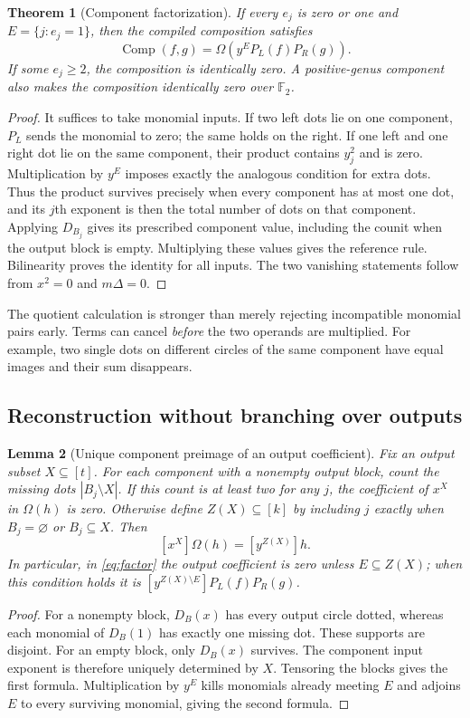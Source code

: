 \documentclass[11pt,letterpaper]{article}
\newtheorem{theorem}{Theorem}[section]
\newtheorem{lemma}[theorem]{Lemma}
\theoremstyle{definition}
\theoremstyle{remark}
\newcommand{\F}{\mathbb F_2}
\newcommand{\Comp}{\operatorname{Comp}}
\begin{document}
\begin{theorem}[Component factorization]
\label{thm:factor}
If every $e_j$ is zero or one and
$E=\{j:e_j=1\}$, then the compiled composition satisfies
\begin{equation}
 \Comp(f,g)=\Omega\!\left(y^E P_L(f)P_R(g)\right).
 \label{eq:factor}
\end{equation}
If some $e_j\geq2$, the composition is identically zero. A positive-genus
component also makes the composition identically zero over $\F$.
\end{theorem}
\begin{proof}
It suffices to take monomial inputs. If two left dots lie on one component,
$P_L$ sends the monomial to zero; the same holds on the right. If one left
and one right dot lie on the same component, their product contains $y_j^2$
and is zero. Multiplication by $y^E$ imposes exactly the analogous condition
for extra dots. Thus the product survives precisely when every component
has at most one dot, and its $j$th exponent is then the total number of dots
on that component. Applying $D_{B_j}$ gives its prescribed component value,
including the counit when the output block is empty. Multiplying these
values gives the reference rule. Bilinearity proves the identity for all
inputs. The two vanishing statements follow from $x^2=0$ and $m\Delta=0$.
\end{proof}

The quotient calculation is stronger than merely rejecting incompatible
monomial pairs early. Terms can cancel \emph{before} the two operands are
multiplied. For example, two single dots on different circles of the same
component have equal images and their sum disappears.

\subsection{Reconstruction without branching over outputs}
\begin{lemma}[Unique component preimage of an output coefficient]
\label{lem:output}
Fix an output subset $X\subseteq[t]$. For each component with a nonempty
output block, count the missing dots $|B_j\setminus X|$. If this count is
at least two for any $j$, the coefficient of $x^X$ in $\Omega(h)$ is zero.
Otherwise define $Z(X)\subseteq[k]$ by including $j$ exactly when
$B_j=\varnothing$ or $B_j\subseteq X$. Then
\[
 [x^X]\Omega(h)=[y^{Z(X)}]h.
\]
In particular, in \eqref{eq:factor} the output coefficient is zero unless
$E\subseteq Z(X)$; when this condition holds it is
$[y^{Z(X)\setminus E}]P_L(f)P_R(g)$.
\end{lemma}
\begin{proof}
For a nonempty block, $D_B(x)$ has every output circle dotted, whereas each
monomial of $D_B(1)$ has exactly one missing dot. These supports are disjoint.
For an empty block, only $D_B(x)$ survives. The component input exponent is
therefore uniquely determined by $X$. Tensoring the blocks gives the first
formula. Multiplication by $y^E$ kills monomials already meeting $E$ and
adjoins $E$ to every surviving monomial, giving the second formula.
\end{proof}
\end{document}
